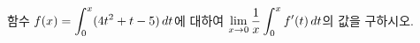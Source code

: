 함수 $f(x)=\displaystyle\int_{0}^{x}(4t^2+t-5)\mkern3mu dt$에 대하여 $\displaystyle\lim_{x\to 0}\dfrac{1}{x}\int_{0}^{x}f'(t)\mkern3mu dt$의 값을 구하시오.
